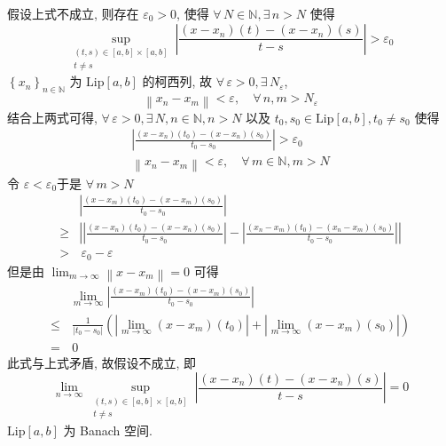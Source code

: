 \documentclass[\ROOT/main.tex]{subfiles}
\begin{document}
假设上式不成立, 则存在 $\varepsilon_0 > 0$, 使得 $\forall \, N \in \mathbb{N}, \exists \, n > N$ 使得
\[
    \sup_{\substack{\left( t, s \right) \in [a, b] \times [a, b] \\ t \neq s}} \left| \frac{\left( x - x_n \right)\left( t \right) - \left( x - x_n \right)\left( s \right)}{t - s} \right|
    >
    \varepsilon_0
\]
$\left\{ x_n \right\}_{n \in \mathbb{N}}$ 为 $\mathrm{Lip} [a, b]$ 的柯西列, 故 $\forall \, \varepsilon > 0, \exists \, N_\varepsilon$,
\[
    \left\| x_n - x_m \right\| < \varepsilon
    , \quad
    \forall \, n, m > N_\varepsilon
\]
结合上两式可得, $\forall \, \varepsilon > 0, \exists \, N, n \in \mathbb{N}, n > N$ 以及 $t_0, s_0 \in \mathrm{Lip} [a, b], t_0 \neq s_0$ 使得
\begin{gather*}
    \left| \frac{\left( x - x_n \right)\left( t_0 \right) - \left( x - x_n \right)\left( s_0 \right)}{t_0 - s_0} \right|
    >
    \varepsilon_0
    \\
    \left\| x_n - x_m \right\| < \varepsilon
    , \quad
    \forall \, m \in \mathbb{N}, m > N
\end{gather*}
令 $\varepsilon < \varepsilon_0$于是 $\forall \, m > N$
\begin{align*}
    &
    \left| \frac{\left( x - x_m \right) \left( t_0 \right) - \left( x - x_m \right) \left( s_0 \right)}{t_0 - s_0} \right|
    \\
    \geqslant&
    \left| \left| \frac{\left( x - x_n \right) \left( t_0 \right) - \left( x - x_n \right) \left( s_0 \right)}{t_0 - s_0} \right| - \left| \frac{\left( x_n - x_m \right) \left( t_0 \right) - \left( x_n - x_m \right) \left( s_0 \right)}{t_0 - s_0} \right| \right|
    \\
    >& \,
    \varepsilon_0 - \varepsilon
\end{align*}
但是由 $\displaystyle \lim_{m \to \infty} \left\| x - x_m \right\| = 0$ 可得
\begin{align*}
    &
    \lim_{m \to \infty} \left| \frac{\left( x - x_m \right) \left( t_0 \right) - \left( x - x_m \right) \left( s_0 \right)}{t_0 - s_0} \right|
    \\
    \leqslant& \,
    \frac{1}{\left| t_0 - s_0 \right|} \left( \left| \lim_{m \to \infty} \left( x - x_m \right) \left( t_0 \right) \right| + \left| \lim_{m \to \infty} \left( x - x_m \right) \left( s_0 \right) \right| \right)
    \\
    =& \,
    0
\end{align*}
此式与上式矛盾, 故假设不成立, 即
\[
    \lim_{n \to \infty} \sup_{\substack{\left( t, s \right) \in [a, b] \times [a, b] \\ t \neq s}} \left| \frac{\left( x - x_n \right)\left( t \right) - \left( x - x_n \right)\left( s \right)}{t - s} \right|
    =
    0
\]
$\mathrm{Lip} [a, b]$ 为 Banach 空间.
\end{document}
